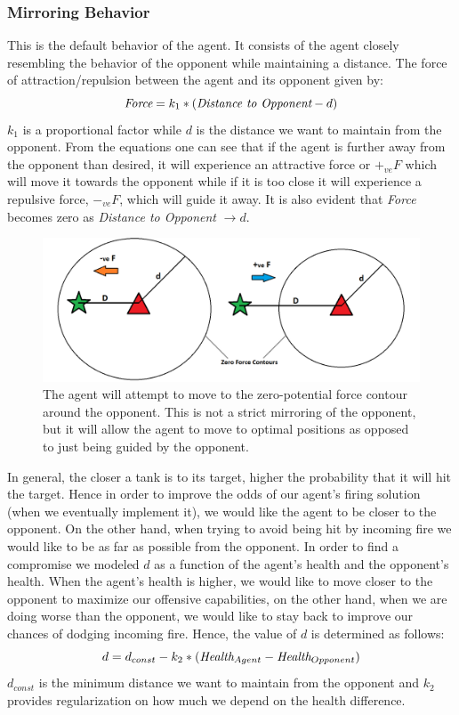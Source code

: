 \documentclass{article}
\theoremstyle{plain}
\theoremstyle{definition}
\theoremstyle{remark}
\begin{document}
\subsubsection*{Mirroring Behavior}
This is the default behavior of the agent. It consists of the agent closely resembling the behavior of the opponent while maintaining a distance. The force of attraction/repulsion between the agent and its opponent given by:
$$\emph{Force} = k_1 * (\emph{Distance to Opponent} - d)$$
$k_1$ is a proportional factor while $d$ is the distance we want to maintain from the opponent. From the equations one can see that if the agent is further away from the opponent than desired, it will experience an attractive force or $+_{ve}F$ which will move it towards the opponent while if it is too close it will experience a repulsive force, $-_{ve}F$, which will guide it away. It is also evident that \emph{Force} becomes zero as \emph{Distance to Opponent}  $\rightarrow d$.\\ 

\begin{figure}[h]
	\centering
		\includegraphics[width= 15cm]{mirror}
		\caption{The agent will attempt to move to the zero-potential force contour around the opponent. This is not a strict mirroring of the opponent, but it will allow the agent to move to optimal positions as opposed to just being guided by the opponent.}		
	\label{mirror}
\end{figure}

In general, the closer a tank is to its target, higher the probability that it will hit the target. Hence in order to improve the odds of our agent's firing solution (when we eventually implement it), we would like the agent to be closer to the opponent. On the other hand, when trying to avoid being hit by incoming fire we would like to be as far as possible from the opponent. In order to find a compromise we modeled $d$ as a function of the agent's health and the opponent's health. When the agent's health is higher, we would like to move closer to the opponent to maximize our offensive capabilities, on the other hand, when we are doing worse than the opponent, we would like to stay back to improve our chances of dodging incoming fire. Hence, the value of $d$ is determined as follows:
$$d = d_{const} - k_2*(\emph{Health}_{Agent} - \emph{Health}_{Opponent})$$
$d_{const}$ is the minimum distance we want to maintain from the opponent and $k_2$ provides regularization on how much we depend on the health difference.\\
\end{document}
